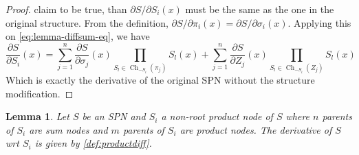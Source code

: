 \documentclass{amsart}
\DeclareMathOperator*{\Ch}{\text{Ch}}
\theoremstyle{plain}
\newcounter{dummy-def}\numberwithin{dummy-def}{section}
\newcounter{dummy-thm}\numberwithin{dummy-thm}{section}
\newcounter{dummy-prop}\numberwithin{dummy-prop}{section}
\newcounter{dummy-corollary}\numberwithin{dummy-corollary}{section}
\newcounter{dummy-lemma}\numberwithin{dummy-lemma}{section}
\newtheorem{lemma}[dummy-lemma]{Lemma}
\newcounter{dummy-ex}\numberwithin{dummy-ex}{section}
\newcounter{dummy-eg}\numberwithin{dummy-eg}{section}
\numberwithin{equation}{section}
\begin{document}
\begin{proof}
  claim to be true, than $\partial S/\partial S_i(x)$ must be the same as the one in the original
  structure. From the definition, $\partial S/\partial \pi_i(x)=\partial S/\partial \sigma_i(x)$.
  Applying this on \autoref{eq:lemma-diffsum-eq}, we have
  \begin{equation*}
    \frac{\partial S}{\partial S_i}(x)=\sum_{j=1}^n\frac{\partial S}{\partial\sigma_j}(x)\prod_{S_l
      \in\Ch_{-S_i}(\pi_j)}S_l(x)+ \sum_{j=1}^n\frac{\partial S}{\partial Z_j}(x)\prod_{S_l\in
      \Ch_{-S_i}(Z_j)}S_l(x)
  \end{equation*}
  Which is exactly the derivative of the original SPN without the structure modification.
\end{proof}

\begin{lemma}\label{lemma:diffproduct} Let $S$ be an SPN and $S_i$ a non-root product node of $S$ where
  $n$ parents of $S_i$ are sum nodes and $m$ parents of $S_i$ are product nodes. The derivative of
  $S$ wrt $S_i$ is given by \autoref{def:productdiff}.
\end{lemma}
\end{document}
